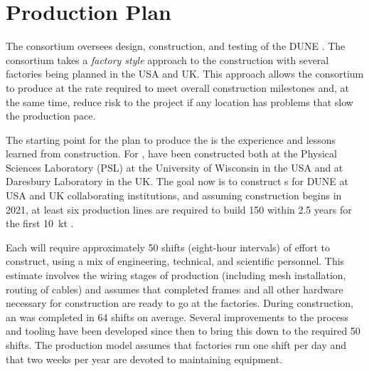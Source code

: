 \section{Production Plan}
\label{sec:fdsp-apa-prod}



The  consortium oversees design, construction, and testing of the DUNE  . %
The  consortium takes a \textit{factory style} approach to the construction with several factories being planned in the USA and UK. This approach allows the consortium to produce  at the rate required to meet overall construction milestones and, at the same time, reduce risk to the project if any location has problems that slow the production pace.

The starting point for the  plan to produce the  is the experience and lessons learned from  construction. For ,  have been constructed both at the Physical Sciences Laboratory (PSL) at the University of Wisconsin in the USA and at Daresbury Laboratory in the UK.  The goal now is to construct s for DUNE at USA and UK collaborating institutions, and assuming construction begins in 2021, at least six production lines are required to build \num{150}  within \num{2.5} years for the first %
\SI{10}{kt} .   

Each  will require approximately \num{50} shifts (eight-hour intervals) of effort to construct, using a mix of engineering, technical, and scientific personnel. This estimate involves the wiring stages of production (including mesh installation, routing of  cables) and assumes that completed frames and all other hardware necessary for construction are ready to go at the factories. During  construction, an  was completed in \num{64} shifts on average. Several improvements to the process and tooling have been developed since then to bring this down to the required \num{50} shifts. The production model assumes that factories run one shift per day and that two weeks per year are devoted to maintaining equipment. 

